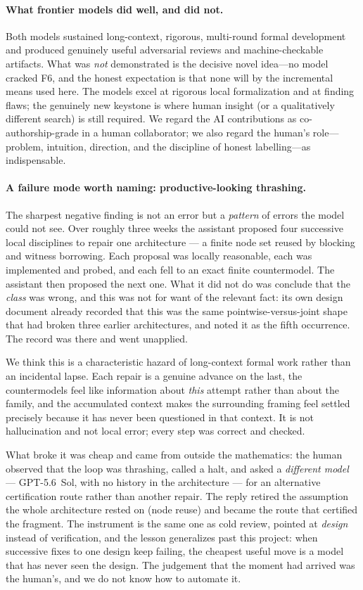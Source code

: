 \documentclass[11pt]{article}
\theoremstyle{plain}
\theoremstyle{definition}
\begin{document}
\paragraph{What frontier models did well, and did not.} Both models
sustained long-context, rigorous, multi-round formal development and
produced genuinely useful adversarial reviews and machine-checkable
artifacts. What was \emph{not} demonstrated is the decisive novel
idea---no model cracked F6, and the honest expectation is that none will
by the incremental means used here. The models excel at rigorous
local formalization and at finding flaws; the genuinely new keystone is
where human insight (or a qualitatively different search) is still
required. We regard the AI contributions as co-authorship-grade in a
human collaborator; we also regard the human's role---problem, intuition,
direction, and the discipline of honest labelling---as indispensable.

\paragraph{A failure mode worth naming: productive-looking thrashing.} The
sharpest negative finding is not an error but a \emph{pattern} of errors the
model could not see. Over roughly three weeks the assistant proposed four
successive local disciplines to repair one architecture --- a finite node set
reused by blocking and witness borrowing. Each proposal was locally reasonable,
each was implemented and probed, and each fell to an exact finite countermodel.
The assistant then proposed the next one. What it did not do was conclude that
the \emph{class} was wrong, and this was not for want of the relevant fact: its
own design document already recorded that this was the same
pointwise-versus-joint shape that had broken three earlier architectures, and
noted it as the fifth occurrence. The record was there and went unapplied.

We think this is a characteristic hazard of long-context formal work rather
than an incidental lapse. Each repair is a genuine advance on the last, the
countermodels feel like information about \emph{this} attempt rather than about
the family, and the accumulated context makes the surrounding framing feel
settled precisely because it has never been questioned in that context. It is
not hallucination and not local error; every step was correct and checked.

What broke it was cheap and came from outside the mathematics: the human
observed that the loop was thrashing, called a halt, and asked a \emph{different
model} --- GPT-5.6~Sol, with no history in the architecture --- for an
alternative certification route rather than another repair. The reply retired
the assumption the whole architecture rested on (node reuse) and became the
route that certified the fragment. The instrument is the same one as cold
review, pointed at \emph{design} instead of verification, and the lesson
generalizes past this project: when successive fixes to one design keep
failing, the cheapest useful move is a model that has never seen the design.
The judgement that the moment had arrived was the human's, and we do not know
how to automate it.
\end{document}
